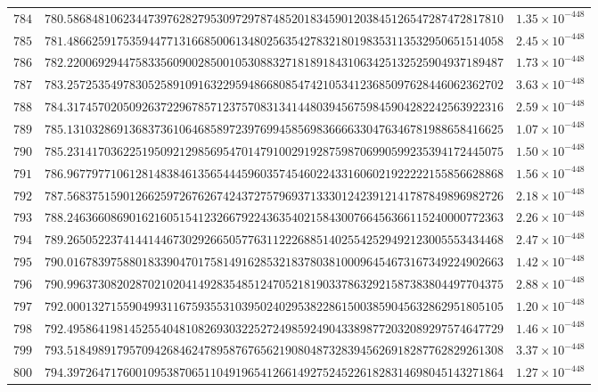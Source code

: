 \documentclass[12pt,reqno]{amsart}
\theoremstyle{remark}
\begin{document}
\begin{longtable}{clc}
$784$ & $780.5868481062344739762827953097297874852018345901203845126547287472817810$ & $1.35\times 10^{-448}$ \\
$785$ & $781.4866259175359447713166850061348025635427832180198353113532950651514058$ & $2.45\times 10^{-448}$ \\
$786$ & $782.2200692944758335609002850010530883271818918431063425132525904937189487$ & $1.73\times 10^{-448}$ \\
$787$ & $783.2572535497830525891091632295948668085474210534123685097628446062362702$ & $3.63\times 10^{-448}$ \\
$788$ & $784.3174570205092637229678571237570831341448039456759845904282242563922316$ & $2.59\times 10^{-448}$ \\
$789$ & $785.1310328691368373610646858972397699458569836666330476346781988658416625$ & $1.07\times 10^{-448}$ \\
$790$ & $785.2314170362251950921298569547014791002919287598706990599235394172445075$ & $1.50\times 10^{-448}$ \\
$791$ & $786.9677977106128148384613565444596035745460224331606021922222155856628868$ & $1.56\times 10^{-448}$ \\
$792$ & $787.5683751590126625972676267424372757969371333012423912141787849896982726$ & $2.18\times 10^{-448}$ \\
$793$ & $788.2463660869016216051541232667922436354021584300766456366115240000772363$ & $2.26\times 10^{-448}$ \\
$794$ & $789.2650522374144144673029266505776311222688514025542529492123005553434468$ & $2.47\times 10^{-448}$ \\
$795$ & $790.0167839758801833904701758149162853218378038100096454673167349224902663$ & $1.42\times 10^{-448}$ \\
$796$ & $790.9963730820287021020414928354851247052181903378632921587383804497704375$ & $2.88\times 10^{-448}$ \\
$797$ & $792.0001327155904993116759355310395024029538228615003859045632862951805105$ & $1.20\times 10^{-448}$ \\
$798$ & $792.4958641981452554048108269303225272498592490433898772032089297574647729$ & $1.46\times 10^{-448}$ \\
$799$ & $793.5184989179570942684624789587676562190804873283945626918287762829261308$ & $3.37\times 10^{-448}$ \\
$800$ & $794.3972647176001095387065110491965412661492752452261828314698045143271864$ & $1.27\times 10^{-448}$ \\

\end{longtable}
\end{document}

